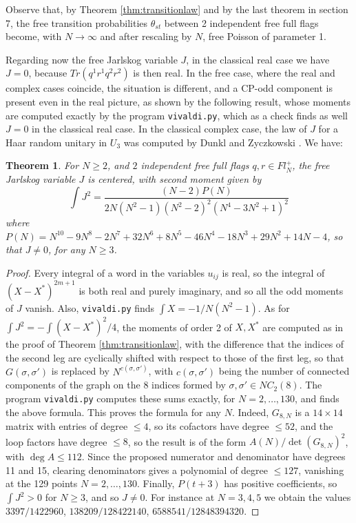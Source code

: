 \documentclass[11pt]{article}
\theoremstyle{plain}
\newtheorem{theorem}{Theorem}[section]
\begin{document}
Observe that, by Theorem \ref{thm:transitionlaw} and by the last theorem in section 7, the free transition probabilities $\theta_{st}$ between 2 independent free full flags become, with $N\to\infty$ and after rescaling by $N$, free Poisson of parameter 1.

\bigskip

Regarding now the free Jarlskog variable $J$, in the classical real case we have $J=0$, because $Tr(q^1r^1q^2r^2)$ is then real. In the free case, where the real and complex cases coincide, the situation is different, and a CP-odd component is present even in the real picture, as shown by the following result, whose moments are computed exactly by the program {\tt vivaldi.py}, which as a check finds as well $J=0$ in the classical real case. In the classical complex case, the law of $J$ for a Haar random unitary in $U_3$ was computed by Dunkl and Zyczkowski \cite{dzy}. We have:

\begin{theorem}
\label{thm:jarlskog}
For $N\geq2$, and $2$ independent free full flags $q,r\in Fl^+_N$, the free Jarlskog variable $J$ is centered, with second moment given by
$$\int J^2=\frac{(N-2)P(N)}{2N(N^2-1)(N^2-2)^2(N^4-3N^2+1)^2}$$
where $P(N)=N^{10}-9N^8-2N^7+32N^6+8N^5-46N^4-18N^3+29N^2+14N-4$, so that $J\neq0$, for any $N\geq3$.
\end{theorem}

\begin{proof}
Every integral of a word in the variables $u_{ij}$ is real, so the integral of $(X-X^*)^{2m+1}$ is both real and purely imaginary, and so all the odd moments of $J$ vanish. Also, {\tt vivaldi.py} finds $\int X=-1/N(N^2-1)$. As for $\int J^2=-\int(X-X^*)^2/4$, the moments of order 2 of $X,X^*$ are computed as in the proof of Theorem \ref{thm:transitionlaw}, with the difference that the indices of the second leg are cyclically shifted with respect to those of the first leg, so that $G(\sigma,\sigma')$ is replaced by $N^{c(\sigma,\sigma')}$, with $c(\sigma,\sigma')$ being the number of connected components of the graph on the 8 indices formed by $\sigma,\sigma'\in NC_2(8)$. The program {\tt vivaldi.py} computes these sums exactly, for $N=2,\ldots,130$, and finds the above formula. This proves the formula for any $N$. Indeed, $G_{8,N}$ is a $14\times14$ matrix with entries of degree $\leq4$, so its cofactors have degree $\leq52$, and the loop factors have degree $\leq8$, so the result is of the form $A(N)/\det(G_{8,N})^2$, with $\deg A\leq112$. Since the proposed numerator and denominator have degrees 11 and 15, clearing denominators gives a polynomial of degree $\leq127$, vanishing at the 129 points $N=2,\ldots,130$. Finally, $P(t+3)$ has positive coefficients, so $\int J^2>0$ for $N\geq3$, and so $J\neq0$. For instance at $N=3,4,5$ we obtain the values $3397/1422960$, $138209/128422140$, $6588541/12848394320$.
\end{proof}
\end{document}
